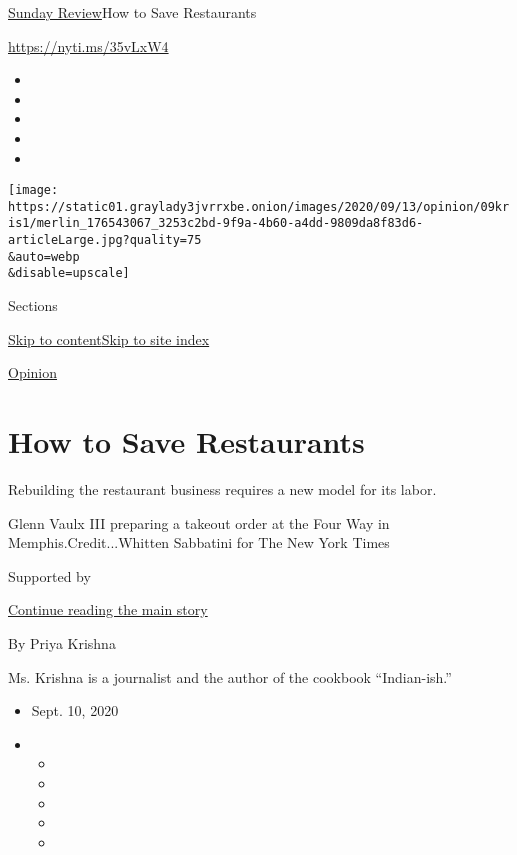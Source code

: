 \href{/section/opinion/sunday}{Sunday Review}\textbar{}How to Save
Restaurants

\url{https://nyti.ms/35vLxW4}

\begin{itemize}
\item
\item
\item
\item
\item
\end{itemize}

\texttt{[image: https://static01.graylady3jvrrxbe.onion/images/2020/09/13/opinion/09kris1/merlin\_176543067\_3253c2bd-9f9a-4b60-a4dd-9809da8f83d6-articleLarge.jpg?quality=75\\\&auto=webp\\\&disable=upscale]}

Sections

\protect\hyperlink{site-content}{Skip to
content}\protect\hyperlink{site-index}{Skip to site index}

\href{/section/opinion}{Opinion}

\hypertarget{how-to-save-restaurants}{%
\section{How to Save Restaurants}\label{how-to-save-restaurants}}

Rebuilding the restaurant business requires a new model for its labor.

Glenn Vaulx III preparing a takeout order at the Four Way in
Memphis.Credit...Whitten Sabbatini for The New York Times

Supported by

\protect\hyperlink{after-sponsor}{Continue reading the main story}

By Priya Krishna

Ms. Krishna is a journalist and the author of the cookbook
``Indian-ish.''

\begin{itemize}
\item
  Sept. 10, 2020
\item
  \begin{itemize}
  \item
  \item
  \item
  \item
  \item
  \end{itemize}
\end{itemize}

